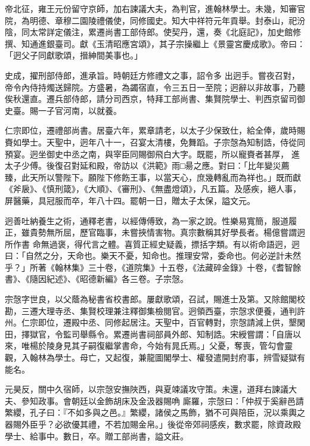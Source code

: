 \begin{pinyinscope}
 帝北征，雍王元份留守京師，加右諫議大夫，為判官，進翰林學士。未幾，知審官院，為明德、章穆二園陵禮儀使，同修國史。知大中祥符元年貢舉。封泰山，祀汾陰，同太常詳定儀注，累遷尚書工部侍郎。使契丹，還，奏《北庭記》，加史館修撰、知通進銀臺司。獻《玉清昭應宮頌》，其子宗操繼上《景靈宮慶成歌》。帝曰：「迥父子同獻歌頌，搢紳間美事也。」



 史成，擢刑部侍郎，進承旨。時朝廷方修禮文之事，詔令多
 出迥手。嘗夜召對，帝令內侍持燭送歸院。方盛暑，為蠲宿直，令三五日一至院；迥辭以非故事，乃聽俟秋還直。遷兵部侍郎，請分司西京，特拜工部尚書、集賢院學士、判西京留司御史臺。賜一子官河南，以就養。



 仁宗即位，遷禮部尚書。居臺六年，累章請老，以太子少保致仕，給全俸，歲時賜賚如學士。天聖中，迥年八十一，召宴太清樓，免舞蹈。子宗愨為知制誥，侍從同預宴。迥坐御史中丞之南，與宰臣同賜御飛白大字。既罷，所以寵賚者甚厚，
 進太子少傅。後復召對延和殿，帝訪以《洪範》雨□昜之應。對曰：「比年變災薦臻，此天所以警陛下。願陛下修飭王事，以當天心，庶幾轉亂而為祥也。」既而獻《斧扆》、《慎刑箴》，《大順》、《審刑》、《無盡燈頌》，凡五篇。及感疾，絕人事，屏醫藥，具冠服而卒，年八十四。罷朝一日，贈太子太保，謚文元。



 迥善吐納養生之術，通釋老書，以經傳傅致，為一家之說。性樂易寬簡，服道履正，雖貴勢無所屈，歷官臨事，未嘗挾情害物。真宗數稱其好學長者。楊億嘗謂迥所作書
 命無過褒，得代言之體。喜質正經史疑義，摽括字類。有以術命語迥，迥曰：「自然之分，天命也。樂天不憂，知命也。推理安常，委命也。何必逆計未然乎？」所著《翰林集》三十卷，《道院集》十五卷，《法藏碎金錄》十卷，《耆智餘書》、《隨因紀述》、《昭德新編》各三卷。子宗愨。



 宗愨字世良，以父蔭為秘書省校書郎。屢獻歌頌，召試，賜進士及第。又除館閣校勘，三遷大理寺丞、集賢校理兼注釋御集檢閱官。迥領西臺，宗愨求便養，通判許
 州。仁宗即位，遷殿中丞、同修起居注。天聖中，百官轉對，宗愨請減上供，墾閑田，擇獄官，令監司舉縣令。累遷尚書祠部員外郎、知制誥。宋綬嘗謂：「自唐以來，唯楊於陵身見其子嗣復繼掌書命，今始有晁氏焉。」父憂，奪喪，管勾會靈觀，入翰林為學士。母亡，又起復，兼龍圖閣學士、權發遣開封府事，辨雪疑獄有能名。



 元昊反，關中久宿師，以宗愨安撫陜西，與夏竦議攻守策。未還，道拜右諫議大夫、參知政事。會朝廷以金飾胡床及金汲器賜唃
 廝羅，宗愨曰：「仲叔于奚辭邑請繁纓，孔子曰：『不如多與之邑。』繁纓，諸侯之馬飾，猶不可與陪臣，況以乘輿之器賜外臣乎？必欲優其禮，不若加賜金帛。」後從帝郊祠感疾，數求罷，除資政殿學士、給事中。數日，卒。贈工部尚書，謚文莊。




\end{pinyinscope}
